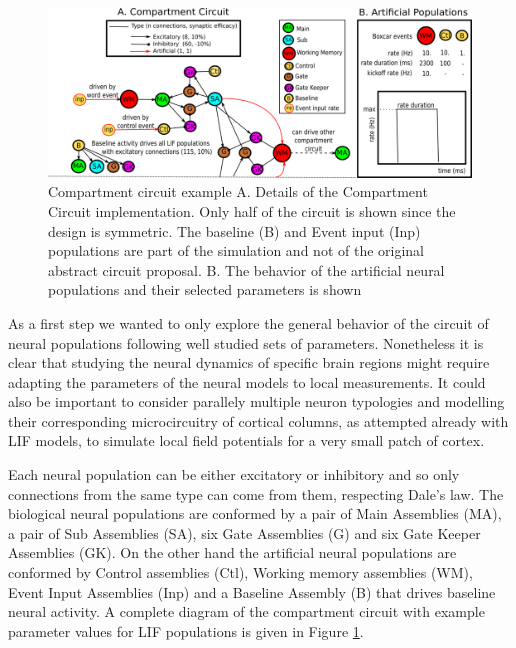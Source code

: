 \documentclass[10pt]{article}
\begin{document}
\begin{figure}[h!]
  \begin{center}
    \includegraphics[width=1.00\columnwidth]{figures/circuit_specs3/circuit_specs3}
    \caption{{Compartment circuit example {\label{circuit_spec}} A.
Details
        of the Compartment Circuit implementation.
Only half of the
        circuit is shown since the design is symmetric.
The baseline
        (B) and Event input (Inp) populations are part of the
        simulation and not of the original abstract circuit proposal.
        B.
The behavior of the artificial neural populations and their
        selected parameters is shown%
      }}
  \end{center}
\end{figure}

As a first step we wanted to only explore the general behavior of the circuit of neural populations following well studied sets of parameters.
Nonetheless it is clear that studying the neural dynamics of specific brain regions might require adapting the parameters of the neural models to local measurements.
It could also be important to consider parallely multiple neuron typologies and modelling their corresponding microcircuitry of cortical columns, as attempted already with LIF models, to simulate local field potentials for a very small patch of cortex\cite{Mazzoni_2015,Hagen_2015}.

Each neural population can be either excitatory or inhibitory and so only connections from the same type can come from them, respecting Dale's law.
The biological neural populations are conformed by a pair of Main Assemblies (MA), a pair of Sub Assemblies (SA), six Gate Assemblies (G) and six Gate Keeper Assemblies (GK).
On the other hand the artificial neural populations are conformed by Control assemblies (Ctl), Working memory assemblies (WM), Event Input Assemblies (Inp) and a Baseline Assembly (B) that drives baseline neural activity.
A complete diagram of the compartment circuit with example parameter values for LIF populations is given in Figure \ref{circuit_spec}.
\end{document}
